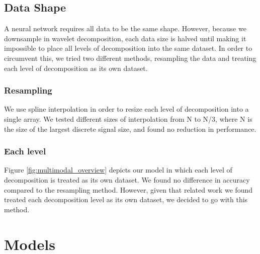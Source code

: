\documentclass{turabian-thesis}
\begin{document}






\section{Data Shape}

A neural network requires all data to be the same shape. However, because we downsample in wavelet decomposition, each data size is halved until making it impossible to place all levels of decomposition into the same dataset. In order to circumvent this, we tried two different methods, resampling the data and treating each level of decomposition as its own dataset.


\subsection{Resampling}

We use spline interpolation in order to resize each level of decomposition into a single array. We tested different sizes of interpolation from N to N/3, where N is the size of the largest discrete signal size, and found no reduction in performance.

\subsection{Each level}
Figure \ref{fig:multimodal_overview} depicts our model in which each level of decomposition is treated as its own dataset. We found no difference in accuracy compared to the resampling method. However, given that related work we found treated each decomposition level as its own dataset, we decided to go with this method. 


\chapter{Models}
\label{chap:models}

\end{document}
